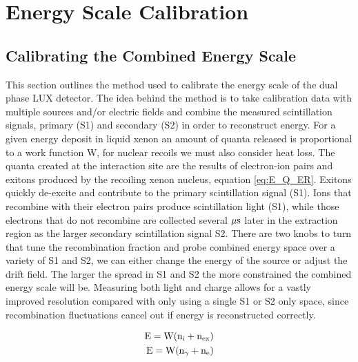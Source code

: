 \renewcommand{\thechapter}{4}

\chapter{Energy Scale Calibration}

\section{Calibrating the Combined Energy Scale}

This section outlines the method used to calibrate the energy scale of the dual phase LUX detector. The idea behind the method is to take calibration data with multiple sources and/or electric fields and combine the measured scintillation signals, primary (S1) and secondary (S2) in order to reconstruct energy. For a given energy deposit in liquid xenon an amount of quanta released is proportional to a work function W, for nuclear recoils we must also consider heat loss. The quanta created at the interaction site are the results of electron-ion pairs and exitons produced by the recoiling xenon nucleus, equation \ref{eq:E_Q_ER}.
Exitons quickly de-excite and contribute to the primary scintillation signal (S1). Ions that recombine with their electron pairs produce scintillation light (S1), while those electrons that do not recombine are collected several $\rm \mu s$ later in the extraction region as the larger secondary scintillation signal S2. 
There are two knobs to turn that tune the recombination fraction and probe combined energy space over a variety of S1 and S2, we can either change the energy of the source or adjust the drift field. The larger the spread in S1 and S2 the more constrained the combined energy scale will be. Measuring both light and charge allows for a vastly improved resolution compared with only using a single S1 or S2 only space, since recombination fluctuations cancel out if energy is reconstructed correctly.

\begin{equation}
\begin{split}
\rm E= W (n_i + n_{ex}) \\
\rm E= W (n_\gamma + n_e)  \\
\label{eq:E_Q_ER}
\end{split}
\end{equation}



